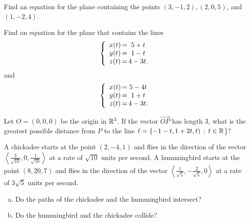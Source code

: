 \documentclass{watsonbook}
\begin{document}

\begin{aexercise}
  Find an equation for the plane containing the points $(3, -1, 2),
  (2, 0, 5)$, and $(1, -2, 4)$.
\end{aexercise}

\begin{aexercise}
  Find an equation for the plane that contains the lines
  \[
    \left\{
      \begin{array}{c@{\,}c@{\,}c}
        x(t)&=&5+t \\
        y(t)&=&1-t \\
        z(t)&=&4-3t. 
      \end{array}
    \right.
  \]
  and
  \[
    \left\{
      \begin{array}{c@{\,}c@{\,}c}
        x(t)&=&5-4t \\
        y(t)&=&1+t \\
        z(t)&=&4-3t. 
      \end{array}
    \right.
  \]
\end{aexercise}

\begin{aexercise}
  Let $O=(0,0,0)$ be the origin in $\mathbb{R}^3$. If the vector
  $\overrightarrow{OP}$ has length 3, what is the greatest possible
  distance from $P$ to the line
  $\ell = \{-1-t,1+2t,t) \,:\, t\in \mathbb{R}$\}?
\end{aexercise}


\begin{aexercise}
  A chickadee starts at the point $(2,-4,1)$ and flies in the direction
  of the vector
  $\left\langle\frac{3}{\sqrt{10}},0,\frac{1}{\sqrt{10}}\right\rangle$
  at a rate of $\sqrt{10}$ units per second. A hummingbird starts at the
  point $(8,20,7)$ and flies in the direction of the vector
  $\left\langle\frac{1}{\sqrt{5}},-\frac{2}{\sqrt{5}},0\right\rangle$ at
  a rate of $3\sqrt{5}$ units per second.

  \vspace{6pt}

  \begin{enumerate}[(a),itemsep=6pt]
  \item Do the paths of the chickadee and the hummingbird intersect? 
  \item Do the hummingbird and the chickadee collide?
  \end{enumerate}
\end{aexercise}
\end{document}
